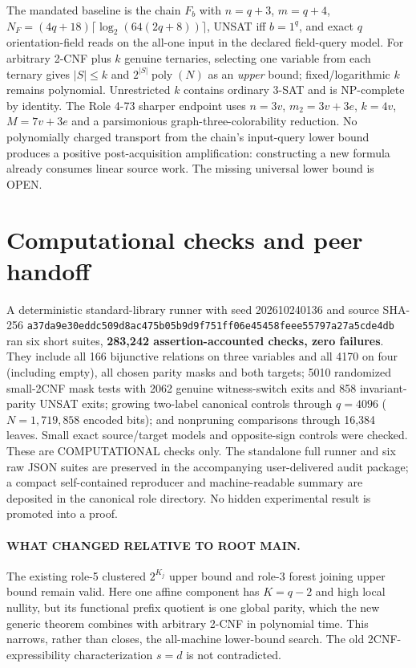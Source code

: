\documentclass[11pt]{article}
\begin{document}
The mandated baseline is the chain $F_b$ with $n=q+3$, $m=q+4$, $N_F=(4q+18)\lceil\log_2(64(2q+8))\rceil$, UNSAT iff $b=1^q$, and exact $q$ orientation-field reads on the all-one input in the declared field-query model. For arbitrary 2-CNF plus $k$ genuine ternaries, selecting one variable from each ternary gives $|S|\le k$ and $2^{|S|}\operatorname{poly}(N)$ as an \emph{upper} bound; fixed/logarithmic $k$ remains polynomial. Unrestricted $k$ contains ordinary 3-SAT and is NP-complete by identity. The Role 4-73 sharper endpoint uses $n=3v$, $m_2=3v+3e$, $k=4v$, $M=7v+3e$ and a parsimonious graph-three-colorability reduction. No polynomially charged transport from the chain's input-query lower bound produces a positive post-acquisition amplification: constructing a new formula already consumes linear source work. The missing universal lower bound is OPEN.

\section{Computational checks and peer handoff}
A deterministic standard-library runner with seed 202610240136 and source SHA-256
\texttt{a37da9e30eddc509}\allowbreak\texttt{d8ac475b05b9d9f7}\allowbreak\texttt{51ff06e45458feee}\allowbreak\texttt{55797a27a5cde4db}
ran six short suites, \textbf{283,242 assertion-accounted checks, zero failures}. They include all 166 bijunctive relations on three variables and all 4170 on four (including empty), all chosen parity masks and both targets; 5010 randomized small-2CNF mask tests with 2062 genuine witness-switch exits and 858 invariant-parity UNSAT exits; growing two-label canonical controls through $q=4096$ ($N=1,719,858$ encoded bits); and nonpruning comparisons through 16,384 leaves. Small exact source/target models and opposite-sign controls were checked. These are COMPUTATIONAL checks only. The standalone full runner and six raw JSON suites are preserved in the accompanying user-delivered audit package; a compact self-contained reproducer and machine-readable summary are deposited in the canonical role directory. No hidden experimental result is promoted into a proof.

\paragraph{WHAT CHANGED RELATIVE TO ROOT MAIN.}
The existing role-5 clustered $2^{K_j}$ upper bound and role-3 forest joining upper bound remain valid. Here one affine component has $K=q-2$ and high local nullity, but its functional prefix quotient is one global parity, which the new generic theorem combines with arbitrary 2-CNF in polynomial time. This narrows, rather than closes, the all-machine lower-bound search. The old 2CNF-expressibility characterization $s=d$ is not contradicted.
\end{document}
